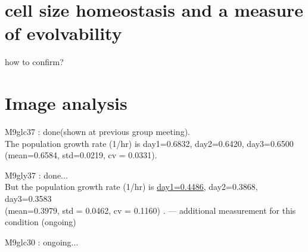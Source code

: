 \documentclass[10pt]{jsarticle}
\begin{document}
\section{cell size homeostasis and a measure of evolvability}
how to confirm?
\section{Image analysis}
M9glc37 : done(shown at previous group meeting). 
 \\ The population growth rate (1/hr) is  day1=0.6832, day2=0.6420, day3=0.6500\\ (mean=0.6584, std=0.0219, cv = 0.0331).

M9gly37 : done... \\ But the population growth rate (1/hr) is  \underline{day1=0.4486}, day2=0.3868, day3=0.3583\\ (mean=0.3979, std = 0.0462, cv = 0.1160)  . --- additional measurement for this condition (ongoing)

M9glc30 : ongoing...
\end{document}
